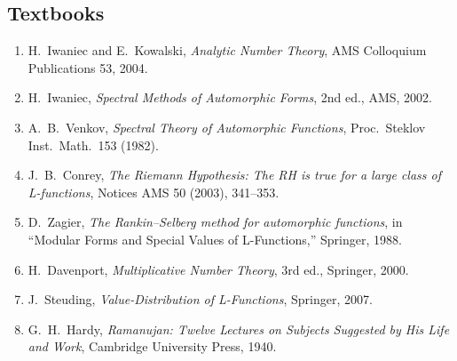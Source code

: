 \subsection*{Textbooks}
\begin{enumerate}
    \item H.\ Iwaniec and E.\ Kowalski, \textit{Analytic Number Theory}, AMS Colloquium Publications 53, 2004.
    \item H.\ Iwaniec, \textit{Spectral Methods of Automorphic Forms}, 2nd ed., AMS, 2002.
    \item A.\ B.\ Venkov, \textit{Spectral Theory of Automorphic Functions}, Proc.\ Steklov Inst.\ Math.\ 153 (1982).
    \item J.\ B.\ Conrey, \textit{The Riemann Hypothesis: The RH is true for a large class of L-functions}, Notices AMS 50 (2003), 341--353.
    \item D.\ Zagier, \textit{The Rankin--Selberg method for automorphic functions}, in ``Modular Forms and Special Values of L-Functions,'' Springer, 1988.
    \item H.\ Davenport, \textit{Multiplicative Number Theory}, 3rd ed., Springer, 2000.
    \item J.\ Steuding, \textit{Value-Distribution of L-Functions}, Springer, 2007.
    \item G.\ H.\ Hardy, \textit{Ramanujan: Twelve Lectures on Subjects Suggested by His Life and Work}, Cambridge University Press, 1940.
\end{enumerate}

